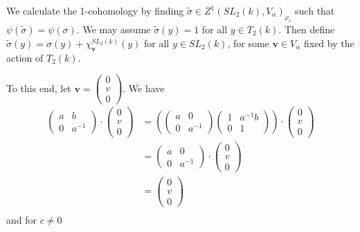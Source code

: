 We calculate the 1-cohomology by finding $\widetilde{\sigma}\in Z^1(SL_2(k), V_\alpha)_{\rho_r}$ such that $\psi(\widetilde{\sigma}) = \psi(\sigma)$. We may assume $\widetilde{\sigma}(y) = 1$ for all $y \in T_2(k)$. Then define $\widetilde{\sigma}(y) = \sigma(y) + \chi^{SL_2(k)}_\mathbf{v}(y)$ for all $y\in SL_2(k)$, for some $\mathbf{v}\in V_\alpha$ fixed by the action of $T_2(k)$.

To this end, let $\mathbf{v} = \left(\begin{matrix}0\\v\\0\end{matrix}\right)$. We have 
\begin{align*}
	\left(\begin{matrix}a & b\\0 & a^{-1}\end{matrix}\right) \cdot \left(\begin{matrix}0\\v\\0\end{matrix}\right) &=
	\left(\left(\begin{matrix}a & 0\\0 & a^{-1}\end{matrix}\right)\left(\begin{matrix}1 & a^{-1}b\\0 & 1\end{matrix}\right)\right) \cdot \left(\begin{matrix}0\\v\\0\end{matrix}\right) \\
	&=\left(\begin{matrix}a & 0\\0 & a^{-1}\end{matrix}\right) \cdot \left(\begin{matrix}0\\v\\0\end{matrix}\right) \\
	&=\left(\begin{matrix}0\\v\\0\end{matrix}\right) \\
\end{align*}
and for $c\neq 0$
